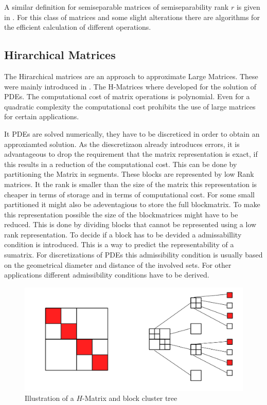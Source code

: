 \documentclass[doctype=mastersthesis,BCOR=15mm,biblatex]{ldvbook}%
\begin{document}
A similar definition for semiseparable matrices of semiseparability rank $r$ is given in \cite{vandebril_bibliography_2005}.
For this class of matrices and some slight alterations there are algorithms for the efficient calculation of different operations.

\subsection{Hirarchical Matrices}
The Hirarchical matrices are an approach to approximate Large Matrices. These were mainly introduced in \cite{grasedyck_theorie_2001,hackbusch_hierarchische_2009}.
The H-Matrices where developed for the solution of PDEs.
The computational cost of matrix operations is polynomial. Even for a quadratic complexity the computational cost prohibits the use of large matrices for certain applications.

It PDEs are solved numerically, they have to be discreticed in order to obtain an approxiamted solution.
As the diescretizaon already introduces errors, it is advantageous to drop the requirement that the matrix representation is exact, if this results in a reduction of the computational cost.
This can be done by partitioning the Matrix in segments. These blocks are represented by low Rank matrices. It the rank is smaller than the size of the matrix this representation is cheaper in terms of storage and in terms of computational cost.
For some small partitioned it might also be adeventagious to store the full blockmatrix.
To make this representation possible the size of the blockmatrices might have to be reduced.
This is done by dividing blocks that cannot be represented using a low rank representation.
To decide if a block has to be devided a admissabillity condition is introduced.
This is a way to predict the representability of a sumatrix.
For discretizations of PDEs this admissibility condition is usually based on the geometrical diameter and distance of the involved sets.
For other applications different admissibility conditions have to be derived.

\begin{figure}
	\centering
	\includegraphics[width=0.7\linewidth]{diagrams/Struktur_H-matrix}
	\caption{Illustration of a $H$-Matrix and block cluster tree}
	\label{fig:strukturh-matrix}
\end{figure}
\end{document}
